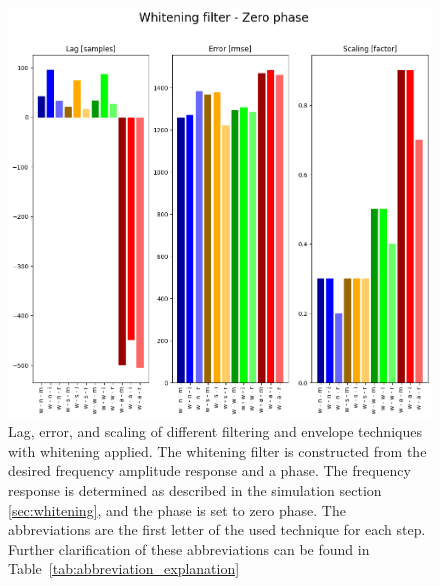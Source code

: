 \begin{figure}[h!t]
	\begin{center}
		\includegraphics[width=1.0\columnwidth]{images/result_whitening_zerophase.png}
	\end{center}
	\caption{Lag, error, and scaling of different filtering and envelope techniques with whitening applied. The whitening filter is constructed from the desired frequency amplitude response and a phase. The frequency response is determined as described in the simulation section \ref{sec:whitening}, and the phase is set to zero phase. The abbreviations are the first letter of the used technique for each step. Further clarification of these abbreviations can be found in Table~\ref{tab:abbreviation_explanation}}
	\label{fig:result_whitening_zerophase}
\end{figure}